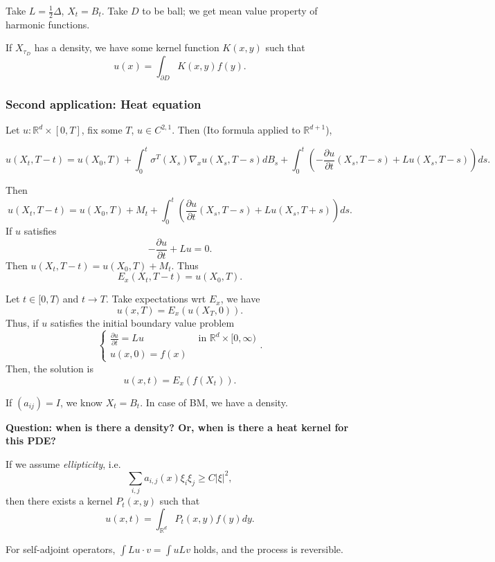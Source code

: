 Take $L = \frac{1}{2} \Delta$, $X_t = B_t$. 
Take $D$ to be ball; we get mean value property of harmonic functions.

If $X_{\tau_D}$ has a density, we have some kernel function $K(x, y)$ such that
\[
	u(x) = \int _{\partial D} K(x,y) f(y)
.\] 

\subsubsection{Second application: Heat equation}

Let $u : \mathbb{R}^d \times [0,T]$, fix some $T$, $u \in C^{2, 1}$. Then (Ito formula applied to $\mathbb{R}^{d + 1}$),

\[
	u(X_t, T- t) = u(X_0, T) + \int _0^t \sigma^T(X_s) \nabla_x u(X_s, T - s) d B_s
	+ \int _0^t \left( - \frac{\partial u}{\partial t} (X_s, T - s) + L u(X_s, T - s) \right)  d s
.\] 

Then
\[
	u(X_t, T - t) = u(X_0, T) 
	+ M_t + \int _0^t \left( \frac{\partial u}{\partial t} (X_s, T - s) + L u(X_s, T + s) \right)  d s
.\] 
If $u$ satisfies
\[
	- \frac{\partial u}{\partial t} + L u = 0
.\] 
Then $u(X_t, T - t) = u(X_0, T) + M_t$. Thus
\[
	E_x(X_t, T - t) = u(X_0, T)
.\] 

Let $t \in  [0,T)$ and $t \to T$. Take expectations wrt $E_x$, we have
\[
	u(x, T) = E_x(u(X_T, 0))
.\] 
Thus, if $u$ satisfies the initial boundary value problem
\[
	\begin{cases}
		\frac{\partial u}{\partial t}  = L u  & \text{ in }\mathbb{R}^d \times [0,\infty )\\
		u(x, 0) = f(x)
	\end{cases}
.\] 
Then, the solution is 
\[
	u(x, t) = E_x(f(X_t))
.\] 

If $(a_{i j}) = I$, we know $X_t = B_t$. In case of BM, we have a density.

\textbf{Question: when is there a density? Or, when is there a heat kernel for this PDE?}

If we assume \textit{ellipticity}, i.e. 
\[
	\sum_{i, j} a_{i, j}(x) \xi_i \xi_j \ge C |\xi|^2
,\] 
then there exists a kernel $P_t(x, y)$ such that
\[
	u(x, t) = \int _{\mathbb{R}^d} P_t(x, y) f(y) dy
.\] 

For self-adjoint operators, $\int L u \cdot  v = \int  u Lv$ holds, and the process is reversible.

